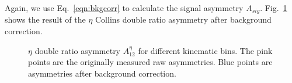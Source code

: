 Again, we use Eq.~\eqref{eqn:bkgcorr} to calculate the signal asymmetry $A_{sig}$. Fig.~\ref{fig:etaafterbkg} shows the result of the $\eta$ Collins double ratio asymmetry after background correction. 

\begin{figure}[H]
  \centering     
  \caption{$\eta$ double ratio asymmetry $A^{\eta}_{12}$ for different kinematic bins. The pink points are the originally measured raw asymmetries. Blue points are asymmetries after background correction.}
  \label{fig:etaafterbkg}
\end{figure}

